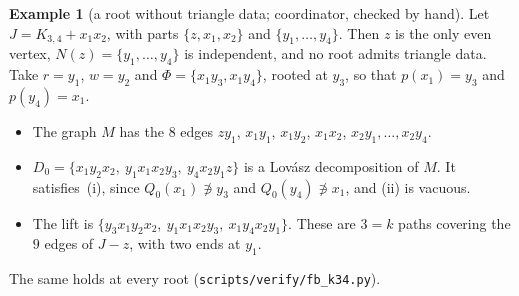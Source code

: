 \documentclass[11pt]{amsart}
\theoremstyle{definition}
\newtheorem{example}[theorem]{Example}
\begin{document}
\begin{example}[a root without triangle data; coordinator, checked by hand]\label{ex:k34}
Let $J=K_{3,4}+x_1x_2$, with parts $\{z,x_1,x_2\}$ and $\{y_1,\dots,y_4\}$. Then $z$ is the only even
vertex, $N(z)=\{y_1,\dots,y_4\}$ is independent, and no root admits triangle data. Take $r=y_1$,
$w=y_2$ and $\Phi=\{x_1y_3,x_1y_4\}$, rooted at $y_3$, so that $p(x_1)=y_3$ and $p(y_4)=x_1$.
\begin{itemize}[leftmargin=*]
\item The graph $M$ has the $8$ edges $zy_1$, $x_1y_1$, $x_1y_2$, $x_1x_2$, $x_2y_1,\dots,x_2y_4$.
\item $D_0=\{x_1y_2x_2,\ y_1x_1x_2y_3,\ y_4x_2y_1z\}$ is a Lov\'asz decomposition of $M$. It satisfies~(i),
since $Q_0(x_1)\not\ni y_3$ and $Q_0(y_4)\not\ni x_1$, and (ii) is vacuous.
\item The lift is $\{y_3x_1y_2x_2,\ y_1x_1x_2y_3,\ x_1y_4x_2y_1\}$. These are $3=k$ paths covering the
$9$ edges of $J-z$, with two ends at $y_1$.
\end{itemize}
The same holds at every root (\texttt{scripts/verify/fb\_k34.py}).
\end{example}
\end{document}
